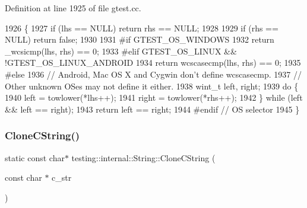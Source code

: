 Definition at line 1925 of file gtest.\+cc.


\begin{DoxyCode}
1926                                                                   \{
1927   \textcolor{keywordflow}{if} (lhs == NULL) \textcolor{keywordflow}{return} rhs == NULL;
1928 
1929   \textcolor{keywordflow}{if} (rhs == NULL) \textcolor{keywordflow}{return} \textcolor{keyword}{false};
1930 
1931 \textcolor{preprocessor}{#if GTEST\_OS\_WINDOWS}
1932   \textcolor{keywordflow}{return} \_wcsicmp(lhs, rhs) == 0;
1933 \textcolor{preprocessor}{#elif GTEST\_OS\_LINUX && !GTEST\_OS\_LINUX\_ANDROID}
1934   \textcolor{keywordflow}{return} wcscasecmp(lhs, rhs) == 0;
1935 \textcolor{preprocessor}{#else}
1936   \textcolor{comment}{// Android, Mac OS X and Cygwin don't define wcscasecmp.}
1937   \textcolor{comment}{// Other unknown OSes may not define it either.}
1938   wint\_t left, right;
1939   \textcolor{keywordflow}{do} \{
1940     left = towlower(*lhs++);
1941     right = towlower(*rhs++);
1942   \} \textcolor{keywordflow}{while} (left && left == right);
1943   \textcolor{keywordflow}{return} left == right;
1944 \textcolor{preprocessor}{#endif  // OS selector}
1945 \}
\end{DoxyCode}
\mbox{\label{classtesting_1_1internal_1_1String_a8bce6b1281ae3d2f9061b920aa78aca0}} 
\subsubsection{\texorpdfstring{Clone\+C\+String()}{CloneCString()}}
{\footnotesize\ttfamily static const char$\ast$ testing\+::internal\+::\+String\+::\+Clone\+C\+String (\begin{DoxyParamCaption}\item[{const char $\ast$}]{c\+\_\+str }\end{DoxyParamCaption})\hspace{0.3cm}{\ttfamily [static]}}

\mbox{\label{classtesting_1_1internal_1_1String_a8bea7b33e7effbd299a0b4a5522ea96e}} 
